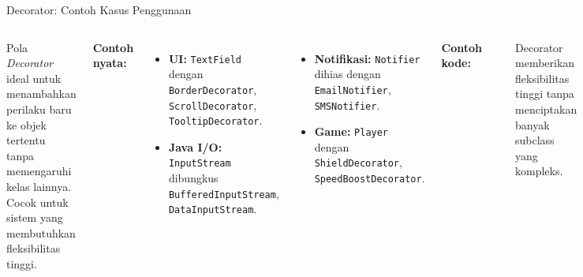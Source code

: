 \documentclass[aspectratio=169, table]{beamer}
\begin{document}
\begin{frame}[fragile]{Decorator: Contoh Kasus Penggunaan}
	\vspace{15pt}
	\begin{columns}[T]
		Pola \textit{Decorator} ideal untuk menambahkan perilaku baru ke objek tertentu tanpa memengaruhi kelas lainnya. Cocok untuk sistem yang membutuhkan fleksibilitas tinggi.
		
		\vspace{10pt}
		\textbf{Contoh nyata:}
		\begin{itemize}
			\item \textbf{UI:} \texttt{TextField} dengan \texttt{BorderDecorator}, \texttt{ScrollDecorator}, \texttt{TooltipDecorator}.
			\item \textbf{Java I/O:} \texttt{InputStream} dibungkus \texttt{BufferedInputStream}, \texttt{DataInputStream}.
		\end{itemize}
		
		\begin{itemize}
			\item \textbf{Notifikasi:} \texttt{Notifier} dihias dengan \texttt{EmailNotifier}, \texttt{SMSNotifier}.
			\item \textbf{Game:} \texttt{Player} dengan \texttt{ShieldDecorator}, \texttt{SpeedBoostDecorator}.
		\end{itemize}
		
		\vspace{5pt}
		\textbf{Contoh kode:}
\begin{lstlisting}[style=JavaStyle]
InputStream input = new BufferedInputStream(
new FileInputStream("data.txt"));
\end{lstlisting}
			\vspace{5pt}
		Decorator memberikan fleksibilitas tinggi tanpa menciptakan banyak subclass yang kompleks.
	\end{columns}
	

\end{frame}
\end{document}

